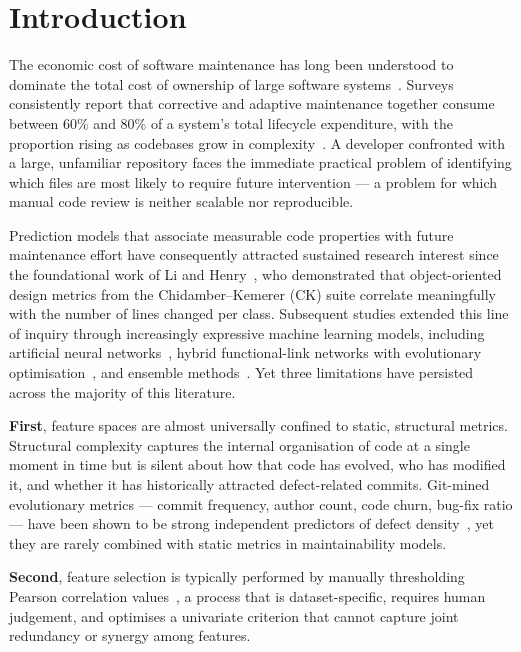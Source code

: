 \documentclass[11pt,a4paper]{article}
\begin{document}
\section{Introduction}
\label{sec:intro}

The economic cost of software maintenance has long been understood to dominate
the total cost of ownership of large software systems~\cite{liHenry1993}.
Surveys consistently report that corrective and adaptive maintenance together
consume between 60\% and 80\% of a system's total lifecycle expenditure, with
the proportion rising as codebases grow in complexity~\cite{riaz2009systematic}.
A developer confronted with a large, unfamiliar repository faces the immediate
practical problem of identifying which files are most likely to require future
intervention --- a problem for which manual code review is neither scalable
nor reproducible.

Prediction models that associate measurable code properties with future
maintenance effort have consequently attracted sustained research interest since
the foundational work of Li and Henry~\cite{liHenry1993}, who demonstrated
that object-oriented design metrics from the Chidamber--Kemerer (CK) suite
correlate meaningfully with the number of lines changed per class. Subsequent
studies extended this line of inquiry through increasingly expressive machine
learning models, including artificial neural networks~\cite{vescan2025},
hybrid functional-link networks with evolutionary optimisation~\cite{kumarRath2016},
and ensemble methods~\cite{alsolai2019application}. Yet three limitations
have persisted across the majority of this literature.

\textbf{First}, feature spaces are almost universally confined to static,
structural metrics. Structural complexity captures the internal organisation
of code at a single moment in time but is silent about how that code has
evolved, who has modified it, and whether it has historically attracted
defect-related commits. Git-mined evolutionary metrics --- commit frequency,
author count, code churn, bug-fix ratio --- have been shown to be strong
independent predictors of defect density~\cite{nagappan2005use}, yet they are
rarely combined with static metrics in maintainability models.

\textbf{Second}, feature selection is typically performed by manually
thresholding Pearson correlation values~\cite{vescan2025}, a process that
is dataset-specific, requires human judgement, and optimises a univariate
criterion that cannot capture joint redundancy or synergy among features.
\end{document}
